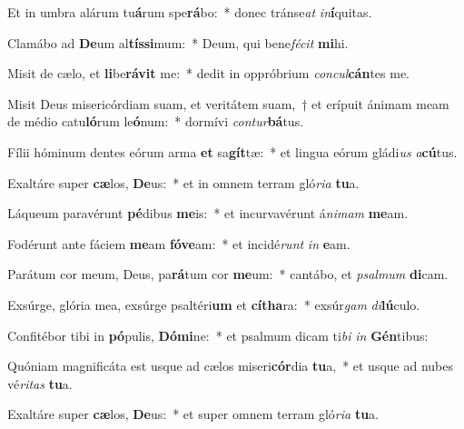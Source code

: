 \item Et in umbra alárum tu\textbf{á}rum spe\textbf{rá}bo:~* donec tránse\textit{at} \textit{in}\textbf{í}quitas.
\item Clamábo ad \textbf{De}um al\textbf{tís}\textbf{si}mum:~* Deum, qui bene\textit{fé}\textit{cit} \textbf{mi}hi.
\item Misit de cælo, et \textbf{li}be\textbf{rá}\textbf{vit} me:~* dedit in oppróbrium \textit{con}\textit{cul}\textbf{cán}tes me.
\item Misit Deus misericórdiam suam, et veritátem suam,~† et erípuit ánimam meam de médio catu\textbf{ló}rum le\textbf{ó}num:~* dormívi \textit{con}\textit{tur}\textbf{bá}tus.
\item Fílii hóminum dentes eórum arma \textbf{et} sa\textbf{gít}tæ:~* et lingua eórum gládi\textit{us} \textit{a}\textbf{cú}tus.
\item Exaltáre super \textbf{cæ}los, \textbf{De}us:~* et in omnem terram gló\textit{ri}\textit{a} \textbf{tu}a.
\item Láqueum paravérunt \textbf{pé}dibus \textbf{me}is:~* et incurvavérunt á\textit{ni}\textit{mam} \textbf{me}am.
\item Fodérunt ante fáciem \textbf{me}am \textbf{fó}\textbf{ve}am:~* et incidé\textit{runt} \textit{in} \textbf{e}am.
\item Parátum cor meum, Deus, pa\textbf{rá}tum cor \textbf{me}um:~* cantábo, et \textit{psal}\textit{mum} \textbf{di}cam.
\item Exsúrge, glória mea, exsúrge psaltéri\textbf{um} et \textbf{cí}\textbf{tha}ra:~* exsúr\textit{gam} \textit{di}\textbf{lú}culo.
\item Confitébor tibi in \textbf{pó}pulis, \textbf{Dó}\textbf{mi}ne:~* et psalmum dicam ti\textit{bi} \textit{in} \textbf{Gén}tibus:
\item Quóniam magnificáta est usque ad cælos miseri\textbf{cór}dia \textbf{tu}a,~* et usque ad nubes vé\textit{ri}\textit{tas} \textbf{tu}a.
\item Exaltáre super \textbf{cæ}los, \textbf{De}us:~* et super omnem terram gló\textit{ri}\textit{a} \textbf{tu}a.

